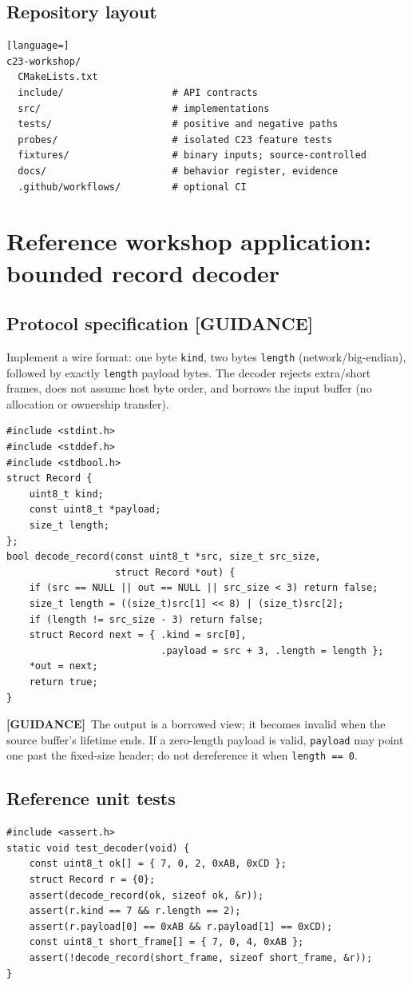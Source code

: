 \documentclass[10pt,letterpaper,oneside]{report}
\newcommand{\guidance}{\textbf{[GUIDANCE]}}
\begin{document}
\section{Repository layout}
\begin{lstlisting}[language=]
c23-workshop/
  CMakeLists.txt
  include/                   # API contracts
  src/                       # implementations
  tests/                     # positive and negative paths
  probes/                    # isolated C23 feature tests
  fixtures/                  # binary inputs; source-controlled
  docs/                      # behavior register, evidence
  .github/workflows/         # optional CI
\end{lstlisting}
\chapter{Reference workshop application: bounded record decoder}
\section{Protocol specification [GUIDANCE]}
Implement a wire format: one byte \texttt{kind}, two bytes \texttt{length} (network/big-endian), followed by exactly \texttt{length} payload bytes. The decoder rejects extra/short frames, does not assume host byte order, and borrows the input buffer (no allocation or ownership transfer).
\begin{lstlisting}
#include <stdint.h>
#include <stddef.h>
#include <stdbool.h>
struct Record {
    uint8_t kind;
    const uint8_t *payload;
    size_t length;
};
bool decode_record(const uint8_t *src, size_t src_size,
                   struct Record *out) {
    if (src == NULL || out == NULL || src_size < 3) return false;
    size_t length = ((size_t)src[1] << 8) | (size_t)src[2];
    if (length != src_size - 3) return false;
    struct Record next = { .kind = src[0],
                           .payload = src + 3, .length = length };
    *out = next;
    return true;
}
\end{lstlisting}
\guidance\ The output is a borrowed view; it becomes invalid when the source buffer's lifetime ends. If a zero-length payload is valid, \texttt{payload} may point one past the fixed-size header; do not dereference it when \texttt{length == 0}.
\section{Reference unit tests}
\begin{lstlisting}
#include <assert.h>
static void test_decoder(void) {
    const uint8_t ok[] = { 7, 0, 2, 0xAB, 0xCD };
    struct Record r = {0};
    assert(decode_record(ok, sizeof ok, &r));
    assert(r.kind == 7 && r.length == 2);
    assert(r.payload[0] == 0xAB && r.payload[1] == 0xCD);
    const uint8_t short_frame[] = { 7, 0, 4, 0xAB };
    assert(!decode_record(short_frame, sizeof short_frame, &r));
}
\end{lstlisting}
\end{document}
